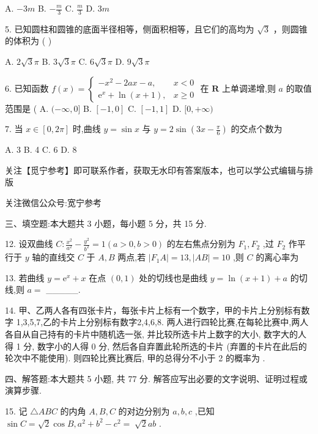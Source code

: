 \documentclass[10pt]{article}
\begin{document}
A. \(- {3m}\) B. \(- \frac{m}{3}\) C. \(\frac{m}{3}\) D. \({3m}\)

5. 已知圆柱和圆锥的底面半径相等，侧面积相等，且它们的高均为 \(\sqrt{3}\) ，则圆锥的体积为 ( )

A. \(2\sqrt{3}\pi\) B. \(3\sqrt{3}\pi\) C. \(6\sqrt{3}\pi\) D. \(9\sqrt{3}\pi\)

6. 已知函数 \(f\left( x\right)  = \left\{  \begin{array}{ll}  - {x}^{2} - {2ax} - a, & x < 0 \\  {\mathrm{e}}^{x} + \ln \left( {x + 1}\right) , & x \geq  0 \end{array}\right.\) 在 \(\mathbf{R}\) 上单调递增,则 \(a\) 的取值范围是 ( A. \(( - \infty ,0\rbrack\) B. \(\left\lbrack  {-1,0}\right\rbrack\) C. \(\left\lbrack  {-1,1}\right\rbrack\) D. \(\lbrack 0, + \infty )\)

7. 当 \(x \in  \left\lbrack  {0,{2\pi }}\right\rbrack\) 时,曲线 \(y = \sin x\) 与 \(y = 2\sin \left( {{3x} - \frac{\pi }{6}}\right)\) 的交点个数为

A. 3 B. 4 C. 6 D. 8

关注【觅宁参考】即可联系作者，获取无水印有答案版本，也可以学公式编辑与排版

关注微信公众号:宽宁参考

三、填空题:本大题共 3 小题，每小题 5 分，共 15 分.

12. 设双曲线 \(C : \frac{{x}^{2}}{{a}^{2}} - \frac{{y}^{2}}{{b}^{2}} = 1\left( {a > 0,b > 0}\right)\) 的左右焦点分别为 \({F}_{1},{F}_{2}\) ,过 \({F}_{2}\) 作平行于 \(y\) 轴的直线交 \(C\) 于 \(A,B\) 两点,若 \(\left| {{F}_{1}A}\right|  = {13},\left| {AB}\right|  = {10}\) ,则 \(C\) 的离心率为

13. 若曲线 \(y = {\mathrm{e}}^{x} + x\) 在点 \(\left( {0,1}\right)\) 处的切线也是曲线 \(y = \ln \left( {x + 1}\right)  + a\) 的切线,则 \(a =\) \_\_\_\_\_.

14. 甲、乙两人各有四张卡片，每张卡片上标有一个数字，甲的卡片上分别标有数字 1,3,5,7,乙的卡片上分别标有数字2,4,6,8. 两人进行四轮比赛,在每轮比赛中,两人各自从自己持有的卡片中随机选一张, 并比较所选卡片上数字的大小, 数字大的人得 1 分, 数字小的人得 0 分, 然后各自弃置此轮所选的卡片 (弃置的卡片在此后的轮次中不能使用). 则四轮比赛比赛后, 甲的总得分不小于 2 的概率为 .

四、解答题:本大题共 5 小题, 共 77 分. 解答应写出必要的文字说明、证明过程或演算步骤.

15. 记 \(\bigtriangleup {ABC}\) 的内角 \(A,B,C\) 的对边分别为 \(a,b,c\) ,已知 \(\sin C = \sqrt{2}\cos B,{a}^{2} + {b}^{2} - {c}^{2} = \; \sqrt{2}{ab}\) .
\end{document}
